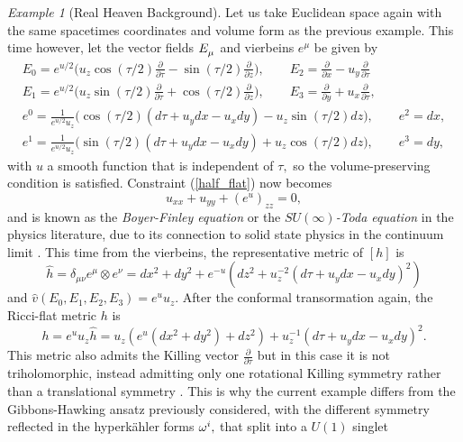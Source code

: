 \documentclass[a4paper,12pt, onecolumn, notitlepage]{article}
\theoremstyle{definition}
\theoremstyle{remark}
\newtheorem{ex}[thm]{Example}
\newcommand{\w}{\omega}
\newcommand{\m}{\mu}
\newcommand{\n}{\nu}
\newcommand{\ddt}[1]{\frac{\partial #1}{\partial \tau}}
\newcommand{\dd}[2]{\frac{\partial #1}{\partial #2}}
\newcommand{\HK}{hyperk\"ahler }
\begin{document}
\begin{ex}[Real Heaven Background]
	Let us take Euclidean space again with the same spacetimes coordinates and volume form as the previous example. This time however, let the vector fields $E\indices{_\m}$ and vierbeins $e^{\m}$ be given by
	\begin{gather*}
		E_{0} = e^{u/2}\bigg(u_{z}\cos(\tau/2)\dd{}{\tau} - \sin(\tau/2)\dd{}{z} \bigg),\qquad E_{2} = \dd{}{x} - u_{y}\dd{}{\tau}\\
		E_{1} = e^{u/2}\bigg(u_{z}\sin(\tau/2)\dd{}{\tau} + \cos(\tau/2)\dd{}{z} \bigg),\qquad E_{3} = \dd{}{y} + u_{x}\dd{}{\tau},\\
		e^{0} = \frac{1}{e^{u/2}u_{z}}\bigg(\cos(\tau/2)(d\tau + u_{y}dx - u_{x}dy) - u_{z}\sin(\tau/2)dz \bigg),\qquad e^{2}=dx,\\
		e^{1} = \frac{1}{e^{u/2}u_{z}}\bigg(\sin(\tau/2)(d\tau + u_{y}dx - u_{x}dy) + u_{z}\cos(\tau/2)dz \bigg),\qquad e^{3}=dy,
	\end{gather*}
	with $u$ a smooth function that is independent of $\tau,$ so the volume-preserving condition is satisfied. Constraint (\ref{half_flat}) now becomes
	\begin{equation}
	\label{su_infty}
		u_{xx} + u_{yy} + (e^{u})_{zz} = 0,
	\end{equation}
	and is known as the \emph{Boyer-Finley equation} or the $SU(\infty)$\emph{-Toda equation} in the physics literature, due to its connection to solid state physics in the continuum limit \cite{tod_1995, lebrun_1991}. This time from the vierbeins, the representative metric of $[h]$ is
	\begin{equation*}
		\hat{h} = \delta_{\m\n}e^{\m}\otimes e^{\n} = dx^{2}+dy^{2} + e^{-u}(dz^{2} + u_{z}^{-2}(d\tau + u_{y}dx - u_{x}dy)^{2})
	\end{equation*}
	and $\hat{v}(E_{0},E_{1},E_{2},E_{3})=e^{u}u_{z}.$ After the conformal transormation again, the Ricci-flat metric $h$ is
	\begin{equation}
	\label{rh_metric}
	h=e^{u}u_{z}\hat{h}=u_{z}(e^{u}(dx^{2}+dy^{2}) + dz^{2}) + u_{z}^{-1}(d\tau + u_{y}dx - u_{x}dy)^{2}.
	\end{equation}
	This metric also admits the Killing vector $\ddt{}$ but in this case it is not triholomorphic, instead admitting only one rotational Killing symmetry rather than a translational symmetry \cite{park_1990}. This is why the current example differs from the Gibbons-Hawking ansatz previously considered, with the different symmetry reflected in the \HK forms $\w\indices{^i},$ that split into a $U(1)$ singlet

\end{ex}
\end{document}
